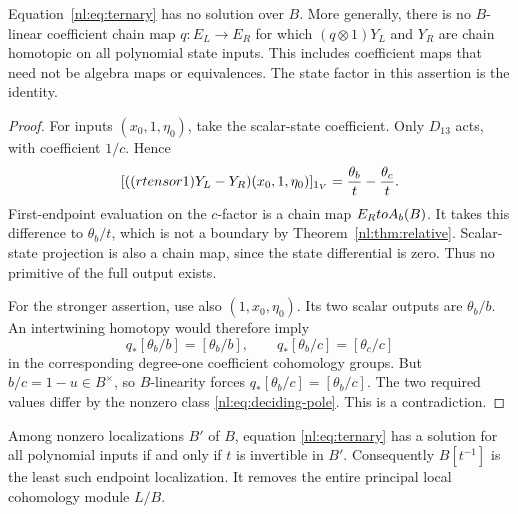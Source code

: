 \begin{theorem}\label{nl:thm:obstruction}
Equation~\eqref{nl:eq:ternary} has no solution over \(B\).
More generally, there is no \(B\)-linear coefficient chain map
\(q:E_L\to E_R\) for which \((q\otimes1)Y_L\) and \(Y_R\)
are chain homotopic on all polynomial state inputs.
This includes coefficient maps that need not be algebra maps or equivalences.
The state factor in this assertion is the identity.
\end{theorem}

\begin{proof}
For inputs \((x_0,1,\eta_0)\), take the scalar-state coefficient.
Only \(D_{13}\) acts, with coefficient \(1/c\). Hence
\begin{equation}\label{nl:eq:deciding-pole}
 [((rtensor1)Y_L-Y_R)(x_0,1,\eta_0)]_{1_{V}}
       =\frac{\theta_b}{t}-\frac{\theta_c}{t}.
\end{equation}
First-endpoint evaluation on the \(c\)-factor is a chain map
\(E_RtoA_b(B)\). It takes this difference to \(\theta_b/t\),
which is not a boundary by Theorem~\ref{nl:thm:relative}.
Scalar-state projection is also a chain map, since the state differential
is zero. Thus no primitive of the full output exists.

For the stronger assertion, use also \((1,x_0,\eta_0)\).
Its two scalar outputs are \(\theta_b/b\).
An intertwining homotopy would therefore imply
\[
 q_*[\theta_b/b]=[\theta_b/b],\qquad
 q_*[\theta_b/c]=[\theta_c/c]
\]
in the corresponding degree-one coefficient cohomology groups.
But \(b/c=1-u\in B^\times\), so \(B\)-linearity forces
\(q_*[\theta_b/c]=[\theta_b/c]\).
The two required values differ by the nonzero class
\eqref{nl:eq:deciding-pole}. This is a contradiction.
\end{proof}

\begin{theorem}
\label{nl:thm:localization}
Among nonzero localizations \(B'\) of \(B\), equation
\eqref{nl:eq:ternary} has a solution for all polynomial inputs if and
only if \(t\) is invertible in \(B'\).
Consequently \(B[t^{-1}]\) is the least such endpoint localization.
It removes the entire principal local cohomology module \(L/B\).
\end{theorem}

